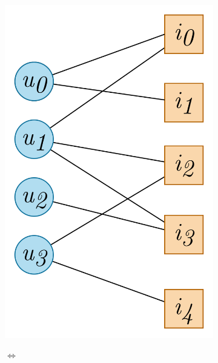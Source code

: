 \begin{figure}[H]
    \centering
    \begin{subfigure}[b]{0.3\textwidth}
        \centering
        \includegraphics[scale=0.13]{images/Chapter3/user-item_graph.png}
        \label{subfig:interaction-graph}
    \end{subfigure}
    \begin{subfigure}[c]{0.12\textwidth}
        \centering
        \vspace*{-65mm}
        \LARGE$\Longleftrightarrow$
    \end{subfigure}
    \begin{subfigure}[b]{0.4\textwidth}

\end{subfigure}
\end{figure}
